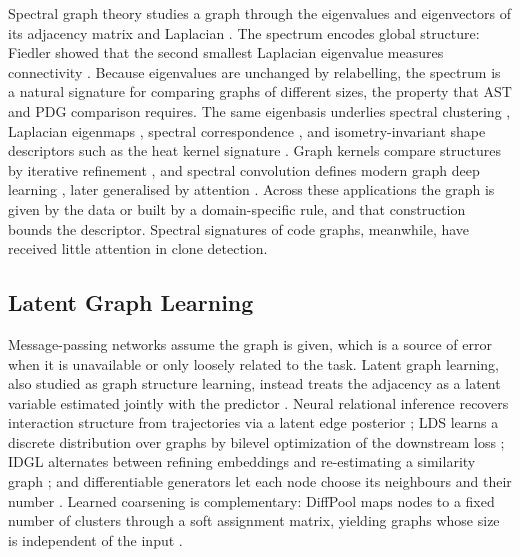 \documentclass[final,5p,times,twocolumn]{elsarticle}
\newcommand{\added}[1]{{\color{green!50!black}#1}}
\theoremstyle{plain}
\begin{document}
Spectral graph theory studies a graph through the eigenvalues and eigenvectors
of its adjacency matrix and Laplacian \cite{chung1997spectral,mohar1991laplacian}.
The spectrum encodes global structure: Fiedler showed that the second smallest
Laplacian eigenvalue measures connectivity \cite{fiedler1973algebraic}. Because
eigenvalues are unchanged by relabelling, the spectrum is a natural signature
for comparing graphs of different sizes, the property that AST and PDG
comparison requires. The same eigenbasis underlies spectral clustering
\cite{shi2000normalized,ng2002spectral,vonluxburg2007tutorial}, Laplacian
eigenmaps \cite{belkin2003laplacian}, spectral correspondence
\cite{leordeanu2005spectral}, and isometry-invariant shape descriptors such as
the heat kernel signature \cite{sun2009hks,zhang2010spectralmesh}. Graph kernels
compare structures by iterative refinement \cite{shervashidze2011wl}, and
spectral convolution defines modern graph deep learning
\cite{bruna2014spectral,defferrard2016cnngraph,kipf2017gcn}, later generalised
by attention \cite{velickovic2018gat}. \added{Across these applications the
graph is given by the data or built by a domain-specific rule, and that
construction bounds the descriptor.} Spectral signatures of code graphs,
meanwhile, have received little attention in clone detection.

\subsection{Latent Graph Learning}
\label{subsec:latent_graph}

\added{Message-passing networks assume the graph is given, which is a source of
error when it is unavailable or only loosely related to the task. Latent graph
learning, also studied as graph structure learning, instead treats the adjacency
as a latent variable estimated jointly with the predictor \cite{zhu2021gslsurvey}.
Neural relational inference recovers interaction structure from trajectories via
a latent edge posterior \cite{kipf2018nri}; LDS learns a discrete distribution
over graphs by bilevel optimization of the downstream loss
\cite{franceschi2019lds}; IDGL alternates between refining embeddings and
re-estimating a similarity graph \cite{chen2020idgl}; and differentiable
generators let each node choose its neighbours and their number
\cite{saha2023adaptive}. Learned coarsening is complementary: DiffPool maps nodes
to a fixed number of clusters through a soft assignment matrix, yielding graphs
whose size is independent of the input \cite{ying2018diffpool}.}
\end{document}
